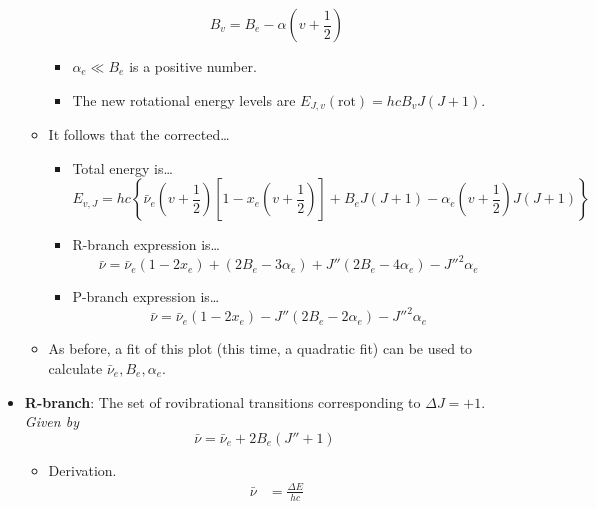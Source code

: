 \documentclass[../notes.tex]{subfiles}
\begin{document}
\begin{itemize}
\begin{itemize}
        \begin{equation*}
            B_v = B_e-\alpha\left( v+\frac{1}{2} \right)
        \end{equation*}
        \begin{itemize}
            \item $\alpha_e\ll B_e$ is a positive number.
            \item The new rotational energy levels are $E_{J,v}(\text{rot})=hcB_vJ(J+1)$.
        \end{itemize}
        \item It follows that the corrected\dots
        \begin{itemize}
            \item Total energy is\dots
            \begin{equation*}
                E_{v,J} = hc\left\{ \bar{\nu}_e\left( v+\frac{1}{2} \right)\left[ 1-x_e\left( v+\frac{1}{2} \right) \right]+B_eJ(J+1)-\alpha_e\left( v+\frac{1}{2} \right)J(J+1) \right\}
            \end{equation*}
            \item R-branch expression is\dots
            \begin{equation*}
                \bar{\nu} = \bar{\nu}_e(1-2x_e)+(2B_e-3\alpha_e)+J''(2B_e-4\alpha_e)-{J''}^2\alpha_e
            \end{equation*}
            \item P-branch expression is\dots
            \begin{equation*}
                \bar{\nu} = \bar{\nu}_e(1-2x_e)-J''(2B_e-2\alpha_e)-{J''}^2\alpha_e
            \end{equation*}
        \end{itemize}
        \item As before, a fit of this plot (this time, a quadratic fit) can be used to calculate $\bar{\nu}_e,B_e,\alpha_e$.
    \end{itemize}
    \item \textbf{R-branch}: The set of rovibrational transitions corresponding to $\Delta J=+1$. \emph{Given by}
    \begin{equation*}
        \bar{\nu} = \bar{\nu}_e+2B_e(J''+1)
    \end{equation*}
    \begin{itemize}
        \item Derivation.
        \begin{align*}
            \bar{\nu} &= \frac{\Delta E}{hc}\\

\end{align*}
\end{itemize}
\end{itemize}
\end{document}

